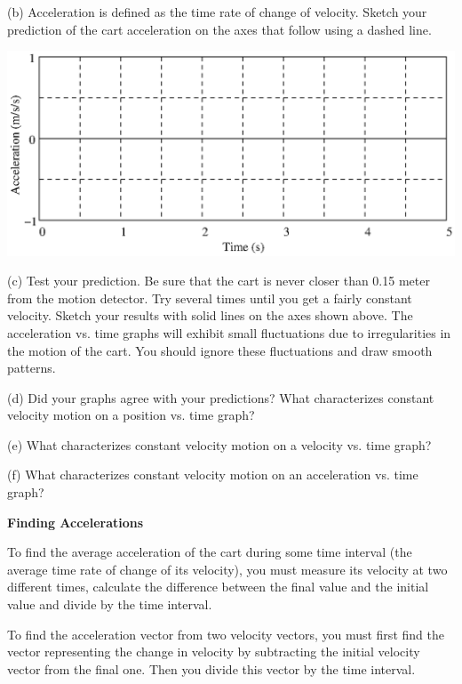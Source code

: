 (b) Acceleration is defined as the time rate of change of velocity. Sketch your
prediction of the cart acceleration on the axes that follow using a dashed line.

\vspace{0.3cm}
{\par\centering \includegraphics{changing/changing_fig2.eps} \par}
\vspace{0.3cm}

(c) Test your prediction. Be sure that the cart is never closer than 0.15 meter
from the motion detector. Try several times until you get a fairly constant
velocity. Sketch your results with solid lines on the axes shown above. The
acceleration vs. time graphs will exhibit small fluctuations due to irregularities
in the motion of the cart. You should ignore these fluctuations and draw smooth
patterns.

(d) Did your graphs agree with your predictions? What characterizes constant
velocity motion on a position vs. time graph? 
\vspace{10mm}

(e) What characterizes constant velocity motion on a velocity vs. time graph?
\vspace{10mm}

(f) What characterizes constant velocity motion on an acceleration vs. time graph?
\vspace{10mm}

\textbf{Finding Accelerations} 

To find the average acceleration of the cart during some time interval (the
average time rate of change of its velocity), you must measure its velocity
at two different times, calculate the difference between the final value and
the initial value and divide by the time interval.

To find the acceleration vector from two velocity vectors, you must first find
the vector representing the change in velocity by subtracting the initial velocity
vector from the final one. Then you divide this vector by the time interval. 

